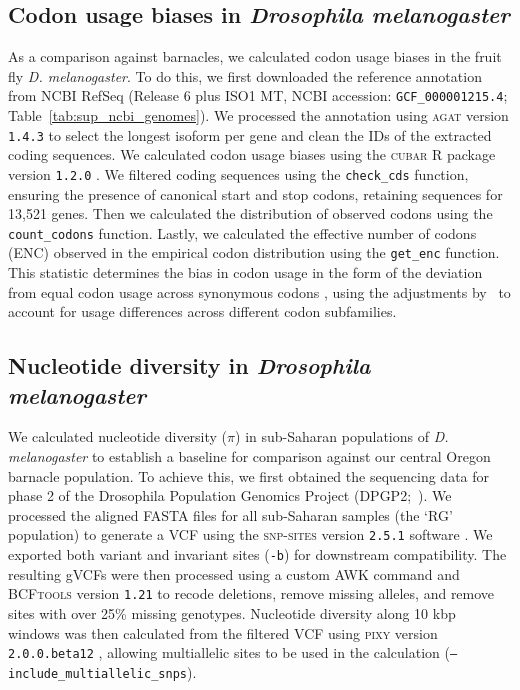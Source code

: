 \documentclass[11pt]{article}
\begin{document}
\subsection*{Codon usage biases in \textit{Drosophila melanogaster}}

As a comparison against barnacles, we calculated codon usage biases in the fruit
fly \textit{D. melanogaster}.
To do this, we first downloaded the reference annotation from NCBI RefSeq
(Release 6 plus ISO1 MT, NCBI accession: \texttt{GCF\_000001215.4};
Table~\ref{tab:sup_ncbi_genomes}).
We processed the annotation using \textsc{agat} version \texttt{1.4.3}
\citep{dainat_another_2022} to select the longest isoform per gene
and clean the IDs of the extracted coding sequences.
We calculated codon usage biases using the \textsc{cubar} R package version
\texttt{1.2.0} \citep{liu_cubar_2026}.
We filtered coding sequences using the \texttt{check\_cds} function, ensuring the
presence of canonical start and stop codons, retaining sequences for 13,521 genes.
Then we calculated the distribution of observed codons using the
\texttt{count\_codons} function.
Lastly, we calculated the effective number of codons (ENC) observed in the
empirical codon distribution using the \texttt{get\_enc} function.
This statistic determines the bias in codon usage in the form of the deviation from
equal codon usage across synonymous codons \citep{wright_effective_1990}, using the 
adjustments by~\cite{sun_improved_2013} to account for usage differences across
different codon subfamilies.

\subsection*{Nucleotide diversity in \textit{Drosophila melanogaster}}

We calculated nucleotide diversity ($\pi$) in sub-Saharan populations of \textit{D.
melanogaster} to establish a baseline for comparison against our central Oregon barnacle
population.
To achieve this, we first obtained the sequencing data for phase 2 of the Drosophila
Population Genomics Project (DPGP2;~\citep{pool_population_2012,lack_dpgp_2016}).
We processed the aligned FASTA files for all sub-Saharan samples (the `RG' population)
to generate a VCF using the \textsc{snp-sites} version \texttt{2.5.1} software
\citep{page_snp-sites_2016}.
We exported both variant and invariant sites (\texttt{-b}) for downstream compatibility.
The resulting gVCFs were then processed using a custom AWK command and \textsc{BCFtools}
version \texttt{1.21} \citep{danecek_bcftools_2021} to recode deletions, remove missing
alleles, and remove sites with over 25\% missing genotypes.
Nucleotide diversity along 10 kbp windows was then calculated from the filtered VCF using
\textsc{pixy} version \texttt{2.0.0.beta12} \citep{korunes_pixy_2021,bailey_pixy2_2025},
allowing multiallelic sites to be used in the calculation
(\texttt{--include\_multiallelic\_snps}).
\end{document}
